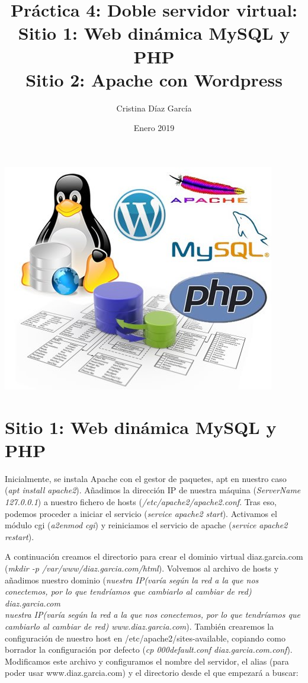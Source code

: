 \documentclass{article}
\title{Práctica 4: Doble servidor virtual:\\Sitio 1: Web dinámica MySQL y PHP\\Sitio 2: Apache con Wordpress}
\author{Cristina Díaz García}
\date{Enero 2019}
\begin{document}

\begin{titlingpage}
\maketitle

\begin{center}
\includegraphics[scale=2]{apache.jpg} 
\end{center}

\end{titlingpage}

\newpage

\tableofcontents

\newpage

\section{Sitio 1: Web dinámica MySQL y PHP}

Inicialmente, se instala Apache con el gestor de paquetes, apt en nuestro caso (\textit{apt install apache2}). Añadimos la dirección IP de nuestra máquina (\textit{ServerName 127.0.0.1}) a nuestro fichero de hosts (\textit{/etc/apache2/apache2.conf}. Tras eso, podemos proceder a iniciar el servicio (\textit{service apache2 start}). Activamos el módulo cgi (\textit{a2enmod cgi}) y reiniciamos el servicio de apache (\textit{service apache2 restart}).

A continuación creamos el directorio para crear el dominio virtual diaz.garcia.com (\textit{mkdir -­p /var/www/diaz.garcia.com/html}). Volvemos al archivo de hosts y añadimos nuestro dominio (\textit{nuestra IP(varía según la red a la que nos conectemos, por lo que tendríamos que cambiarlo al cambiar de red) diaz.garcia.com\\nuestra IP(varía según la red a la que nos conectemos, por lo que tendríamos que cambiarlo al cambiar de red) www.diaz.garcia.com}). También crearemos la configuración de nuestro host en /etc/apache2/sites-available, copiando como borrador la configuración por defecto (\textit{cp 000­default.conf diaz.garcia.com.conf}). Modificamos este archivo y configuramos el nombre del servidor, el alias (para poder usar www.diaz.garcia.com) y el directorio desde el que empezará a buscar:
\end{document}
